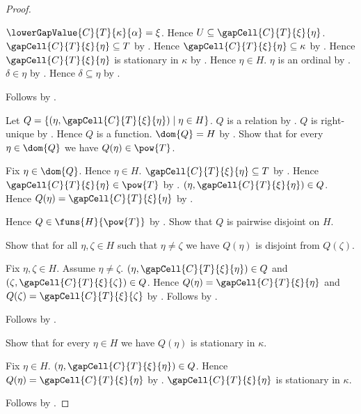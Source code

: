 \begin{proof}
\begin{subproof}
\begin{subproof}
            $\lowerGapValue{C}{T}{\kappa}{\alpha}=\xi$.
            Hence $U\subseteq\gapCell{C}{T}{\xi}{\eta}$.
            $\gapCell{C}{T}{\xi}{\eta}\subseteq T$
                by .
            Hence $\gapCell{C}{T}{\xi}{\eta}\subseteq\kappa$
                by .
            Hence $\gapCell{C}{T}{\xi}{\eta}$ is stationary in $\kappa$
                by .
            Hence $\eta\in H$.
            $\eta$ is an ordinal by .
            $\delta\in\eta$ by .
            Hence $\delta\subseteq\eta$
                by .
        \end{subproof}
        Follows by .
    \end{subproof}
    Let $Q=\{(\eta,\gapCell{C}{T}{\xi}{\eta})\mid\eta\in H\}$.
    $Q$ is a relation by .
    $Q$ is right-unique by .
    Hence $Q$ is a function.
    $\dom{Q}=H$ by .
    Show that for every $\eta\in\dom{Q}$ we have $Q(\eta)\in\pow{T}$.
    \begin{subproof}
        Fix $\eta\in\dom{Q}$.
        Hence $\eta\in H$.
        $\gapCell{C}{T}{\xi}{\eta}\subseteq T$
            by .
        Hence $\gapCell{C}{T}{\xi}{\eta}\in\pow{T}$
            by .
        $(\eta,\gapCell{C}{T}{\xi}{\eta})\in Q$.
        Hence $Q(\eta)=\gapCell{C}{T}{\xi}{\eta}$
            by .
    \end{subproof}
    Hence $Q\in\funs{H}{\pow{T}}$ by .
    Show that $Q$ is pairwise disjoint on $H$.
    \begin{subproof}
        Show that for all $\eta,\zeta\in H$ such that $\eta\neq\zeta$
            we have $Q(\eta)$ is disjoint from $Q(\zeta)$.
        \begin{subproof}
            Fix $\eta,\zeta\in H$.
            Assume $\eta\neq\zeta$.
            $(\eta,\gapCell{C}{T}{\xi}{\eta})\in Q$ and
                $(\zeta,\gapCell{C}{T}{\xi}{\zeta})\in Q$.
            Hence $Q(\eta)=\gapCell{C}{T}{\xi}{\eta}$ and
                $Q(\zeta)=\gapCell{C}{T}{\xi}{\zeta}$
                by .
            Follows by .
        \end{subproof}
        Follows by .
    \end{subproof}
    Show that for every $\eta\in H$ we have
        $Q(\eta)$ is stationary in $\kappa$.
    \begin{subproof}
        Fix $\eta\in H$.
        $(\eta,\gapCell{C}{T}{\xi}{\eta})\in Q$.
        Hence $Q(\eta)=\gapCell{C}{T}{\xi}{\eta}$
            by .
        $\gapCell{C}{T}{\xi}{\eta}$ is stationary in $\kappa$.
    \end{subproof}
    Follows by .
\end{proof}

